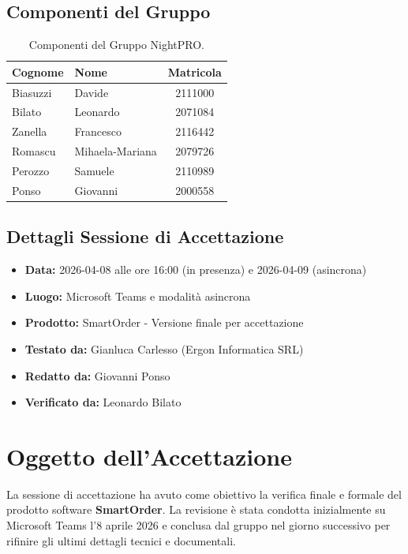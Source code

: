 \documentclass[a4paper, 11pt, oneside]{scrartcl}
\begin{document}
\subsection{Componenti del Gruppo}
\begin{table}[h!]
\centering
\begin{tabular}{@{}llc@{}}
\toprule
\textbf{Cognome} & \textbf{Nome} & \textbf{Matricola} \\
\midrule
Biasuzzi & Davide & 2111000 \\
Bilato & Leonardo & 2071084 \\
Zanella & Francesco & 2116442 \\
Romascu & Mihaela-Mariana & 2079726 \\
Perozzo & Samuele & 2110989 \\
Ponso & Giovanni & 2000558 \\
\bottomrule
\end{tabular}
\caption{Componenti del Gruppo NightPRO.}
\end{table}

\subsection{Dettagli Sessione di Accettazione}
\begin{itemize}
    \item \textbf{Data:} 2026-04-08 alle ore 16:00 (in presenza) e 2026-04-09 (asincrona)
    \item \textbf{Luogo:} Microsoft Teams e modalità asincrona
    \item \textbf{Prodotto:} SmartOrder - Versione finale per accettazione
    \item \textbf{Testato da:} Gianluca Carlesso (Ergon Informatica SRL)
    \item \textbf{Redatto da:} Giovanni Ponso
    \item \textbf{Verificato da:} Leonardo Bilato
\end{itemize}

\newpage
\section{Oggetto dell'Accettazione}
La sessione di accettazione ha avuto come obiettivo la verifica finale e formale del prodotto software \textbf{SmartOrder}. La revisione è stata condotta inizialmente su Microsoft Teams l'8 aprile 2026 e conclusa dal gruppo nel giorno successivo per rifinire gli ultimi dettagli tecnici e documentali.
\end{document}
